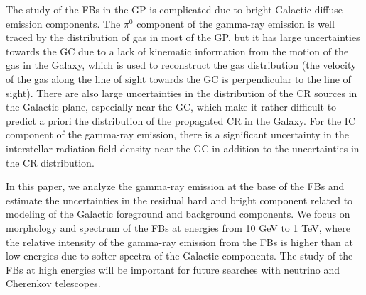 The study of the FBs in the GP is complicated due to bright Galactic diffuse emission components.
The $\pi^0$ component of the gamma-ray emission is well traced by the distribution of gas in most of the GP,
but it has large uncertainties towards the GC due to a lack of kinematic information from the motion of the gas in the 
Galaxy, which is used to reconstruct the gas distribution
(the velocity of the gas along the line of sight towards the GC is perpendicular to the line of sight).
There are also large uncertainties in the distribution of the CR sources in the Galactic plane, especially near the GC,
which make it rather difficult to predict a priori 
the distribution of the propagated CR in the Galaxy.
For the IC component of the gamma-ray emission, 
there is a significant uncertainty in the interstellar radiation field density near the GC \citep[e.g.,][]{2017ApJ...846...67P} in addition to 
the uncertainties in the CR distribution.

In this paper, we analyze the gamma-ray emission at the base of the FBs and 
estimate the uncertainties in the residual hard and bright component
related to modeling of the Galactic foreground and background components.
We focus on morphology and spectrum of the FBs at energies from 10 GeV to 1 TeV,
where the relative intensity of the gamma-ray emission from the FBs is higher than at low energies due to softer spectra of the Galactic components.
The study of the FBs at high energies will be important for future searches with neutrino and Cherenkov telescopes.


